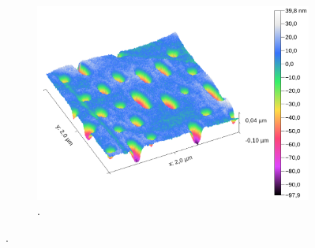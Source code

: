 \begin{figure}[H]
\begin{subfigure}[t]{0.45\textwidth}
	\includegraphics[width=\textwidth]{AFM_auswertung/bluray_3d.png}
	\caption{.}
	\label{abb:br_3d}
	\end{subfigure}
\caption{.}
\label{abb:3d}
\end{figure}

